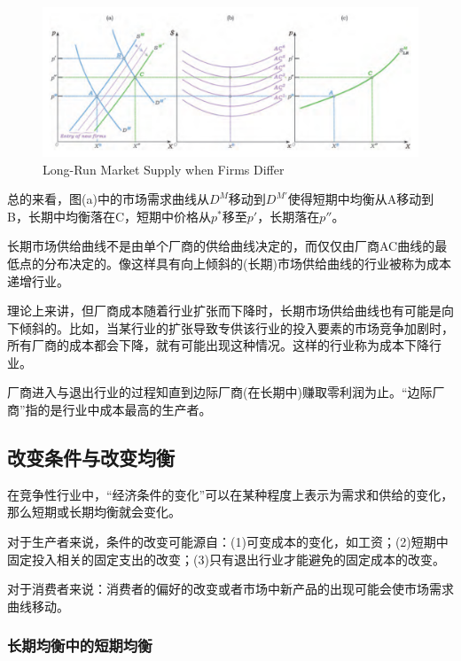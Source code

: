 \documentclass{article}
\begin{document}
\begin{figure}[H] %
	\centering %
	\includegraphics[width=1\textwidth]{14_3} %
	\caption{Long-Run Market Supply when Firms Differ} %
	\label{Fig.main4} %
\end{figure}

总的来看，图(a)中的市场需求曲线从$ D^M $移动到$ D^{M'} $使得短期中均衡从A移动到B，长期中均衡落在C，短期中价格从$ p^* $移至$ p' $，长期落在$ p'' $。

长期市场供给曲线不是由单个厂商的供给曲线决定的，而仅仅由厂商AC曲线的最低点的分布决定的。像这样具有向上倾斜的(长期)市场供给曲线的行业被称为成本递增行业。

理论上来讲，但厂商成本随着行业扩张而下降时，长期市场供给曲线也有可能是向下倾斜的。比如，当某行业的扩张导致专供该行业的投入要素的市场竞争加剧时，所有厂商的成本都会下降，就有可能出现这种情况。这样的行业称为成本下降行业。

\hspace*{\fill}

厂商进入与退出行业的过程知直到边际厂商(在长期中)赚取零利润为止。“边际厂商”指的是行业中成本最高的生产者。

\subsection{改变条件与改变均衡}

在竞争性行业中，“经济条件的变化”可以在某种程度上表示为需求和供给的变化，那么短期或长期均衡就会变化。

对于生产者来说，条件的改变可能源自：(1)可变成本的变化，如工资；(2)短期中固定投入相关的固定支出的改变；(3)只有退出行业才能避免的固定成本的改变。

对于消费者来说：消费者的偏好的改变或者市场中新产品的出现可能会使市场需求曲线移动。

\subsubsection{长期均衡中的短期均衡}
\end{document}
